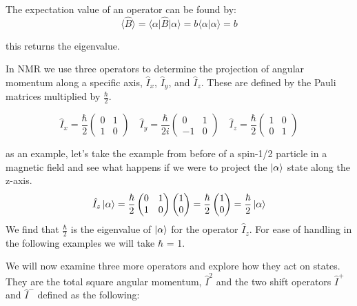 The expectation value of an operator can be found by:
\begin{equation}\label{eqn:expectation}
  \langle\hat{B}\rangle = \langle\alpha\vert\hat{B}\vert\alpha\rangle = b\langle\alpha\vert\alpha\rangle = b
\end{equation}

this returns the eigenvalue.

In NMR we use three operators to determine the projection of angular momentum along a specific axis, $\hat{I}_x$, $\hat{I}_y$, and $\hat{I}_z$. These are defined by the Pauli matrices multiplied by $\frac{\hbar}{2}$.

\begin{equation}
  \hat{I}_x=\frac{\hbar}{2}\begin{pmatrix}
    0 & 1\\
    1 & 0
\end{pmatrix}\quad
\hat{I}_y=\frac{\hbar}{2i}\begin{pmatrix}
  0 & 1\\
  -1 & 0
\end{pmatrix}\quad
\hat{I}_z=\frac{\hbar}{2}\begin{pmatrix}
  1 & 0\\
  0 & 1
\end{pmatrix}
\end{equation}

as an example, let's take the example from before of a spin-1/2 particle in a magnetic field
and see what happens if we were to project the $\ket{\alpha}$ state along the z-axis.
\begin{equation}\label{eqn:operators}
  \hat{I}_z\ket{\alpha} = \frac{\hbar}{2}\begin{pmatrix}
    0 & 1\\
    1 & 0
\end{pmatrix}
\begin{pmatrix}
  1\\
  0
\end{pmatrix} = \frac{\hbar}{2}\begin{pmatrix}
  1\\
  0
\end{pmatrix} = \frac{\hbar}{2}\ket{\alpha}
\end{equation}
We find that $\frac{\hbar}{2}$ is the eigenvalue of $\ket{\alpha}$ for the operator $\hat{I}_z$. For ease of handling in the following examples we will take $\hbar$ = 1.

We will now examine three more operators and explore how they act on states. They are the total square angular momentum, $\hat{I}^2$ and the two shift operators $\hat{I}^+$ and $\hat{I}^-$ defined as the following:

